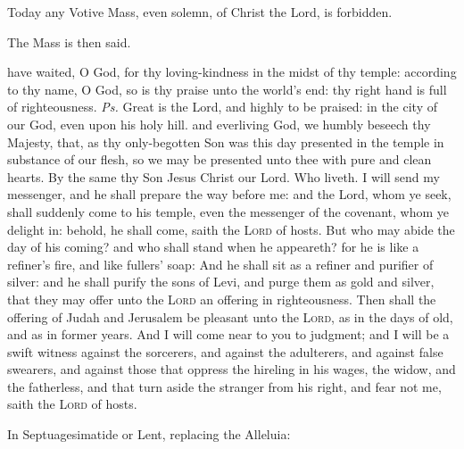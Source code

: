 \begin{rubric}
    Today any Votive Mass, even solemn, of Christ the Lord, is forbidden.
\end{rubric}
\begin{rubric}
    The Mass is then said.
\end{rubric}
\introit
{} have waited, O God, for thy loving-kindness in the midst of thy temple: according to thy name, O God, so is thy praise unto the world's end: thy right hand is full of righteousness. \textit{Ps.} Great is the Lord, and highly to be praised: in the city of our God, even upon his holy hill.
\collect
{} and everliving God, we humbly beseech thy Majesty, that, as thy only-begotten Son was this day presented in the temple in substance of our flesh, so we may be presented unto thee with pure and clean hearts. By the same thy Son Jesus Christ our Lord. Who liveth.
 I will send my messenger, and he shall prepare the way before me: and the Lord, whom ye seek, shall suddenly come to his temple, even the messenger of the covenant, whom ye delight in: behold, he shall come, saith the \textsc{Lord} of hosts. But who may abide the day of his coming? and who shall stand when he appeareth? for he is like a refiner's fire, and like fullers' soap: And he shall sit as a refiner and purifier of silver: and he shall purify the sons of Levi, and purge them as gold and silver, that they may offer unto the \textsc{Lord} an offering in righteousness. Then shall the offering of Judah and Jerusalem be pleasant unto the \textsc{Lord}, as in the days of old, and as in former years. And I will come near to you to judgment; and I will be a swift witness against the sorcerers, and against the adulterers, and against false swearers, and against those that oppress the hireling in his wages, the widow, and the fatherless, and that turn aside the stranger from his right, and fear not me, saith the \textsc{Lord} of hosts.




\begin{rubric}
{In Septuagesimatide or Lent, replacing the Alleluia:}
\end{rubric}\par\noindent

